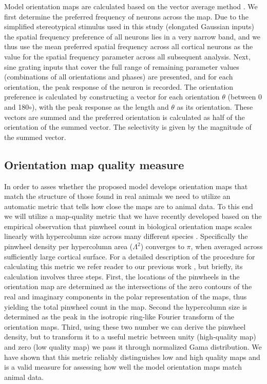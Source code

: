 \documentclass[a4paper,10pt]{article}
\begin{document}
Model orientation maps are calculated based on the vector average method \cite{CMVC}. We first determine the preferred frequency of neurons 
across the map. Due to the simplified stereotypical stimulus used in this study (elongated Gaussian inputs) the spatial frequency 
preference of all neurons lies in a very narrow band, and we thus use the mean preferred spatial frequency across all cortical neurons as the
value for the spatial frequency parameter across all subsequent analysis. Next, sine grating inputs that cover the full range of remaining parameter values (combinations of all orientations and phases) are presented, and for each orientation, the peak response of the neuron is recorded. The orientation preference is calculated by constructing a vector for each orientation $\theta$ (between 0 and 180$\circ$), with the peak response as
the length and $\theta$ as its orientation. These vectors are summed and the preferred orientation is calculated as half of the orientation of the summed vector. The selectivity is given by the magnitude of the summed vector. 

\subsection{Orientation map quality measure}

In order to asses whether the proposed model develops orientation maps that match the structure of those found in real 
animals we need to utilize an automatic metric that tells how close the maps are to animal data. To this end we will 
utilize a map-quality metric that we have recently developed \cite{Stevens2013} based on the empirical observation that pinwheel count 
in biological orientation maps scales linearly with hypercolumn size across many different species \cite{Kaschube2010}.
Specifically the pinwheel density per hypercolumn area ($\Lambda^2$) converges to $\pi$, when averaged across sufficiently 
large cortical surface. For a detailed description of the procedure for calculating this metric we refer reader to 
our previous work \cite{Stevens2013}, but briefly, its calculation involves three steps. First, the locations of the pinwheels
in the orientation map are determined as the intersections of the zero contours of the real and imaginary 
components in the polar representation of the maps, thus yielding the total pinwheel count in the map. Second the 
hypercolumn size is determined as the peak in the isotropic ring-like Fourier transform of the orientation maps.
Third, using these two number we can derive the pinwheel density, but to transform it to a useful metric between 
unity (high-quality map) and zero (low quality map) we pass it through normalized Gama distribution. 
We have shown that this metric reliably distinguishes low and high quality maps \cite{Stevens2013}
and is a valid measure for assessing how well the model orientation maps match animal data.
\end{document}
